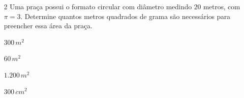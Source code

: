

\num{2}  Uma praça possui o formato circular com diâmetro medindo $20$ metros,
com $\pi = 3$.
Determine quantos metros quadrados de grama são necessários para preencher
essa área da praça.

\begin{escolha}
\item $300\,m^2$
\item $60\,m^2$
\item $1.200\,m^2$
\item $300\,cm^2$
\end{escolha}



